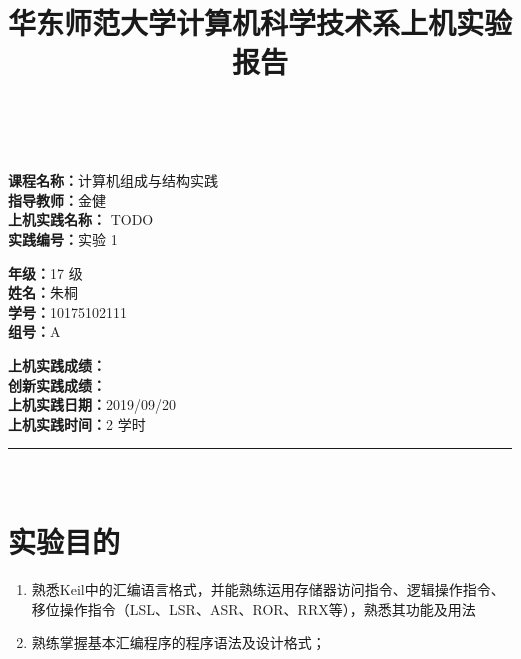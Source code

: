 \documentclass[a4paper,10pt,UTF8]{paper}
\title{华东师范大学计算机科学技术系上机实验报告}
\numberwithin{equation}{section}
\numberwithin{figure}{section}
\begin{document}
\pagestyle{fancy}
\lhead{}
\rhead{}
\makeatletter
\def\headrule{{\if@fancyplain\let\headrulewidth\plainheadrulewidth\fi%
\color{gray}\hrule\@height 0.2pt\@width\headwidth}
  \vspace{6mm}}
\makeatother

\newcommand{\HRule}{\rule{\linewidth}{1mm}}
\newcommand{\dai}{\textbf{Dais-CMX16$^+$}}

{ \\ [0.8cm]

\small{
  \begin{minipage}[t]{.32\linewidth}
    \textbf{课程名称：}计算机组成与结构实践\\
    \textbf{指导教师：}金健\\
    \textbf{上机实践名称：} TODO\\
    \textbf{实践编号：}实验 1
  \end{minipage}
  \begin{minipage}[t]{.32\linewidth}
    \textbf{年级：}17 级\\
    \textbf{姓名：}朱桐\\
    \textbf{学号：}10175102111\\
    \textbf{组号：}A
  \end{minipage} 
  \begin{minipage}[t]{.32\linewidth}
    \textbf{上机实践成绩：} \\
    \textbf{创新实践成绩：} \\
    \textbf{上机实践日期：}2019/09/20\\
    \textbf{上机实践时间：}2 学时\\
  \end{minipage}
}
\HRule \\[0.5cm]
}


\section{实验目的}

\begin{enumerate}
    \item 熟悉Keil中的汇编语言格式，并能熟练运用存储器访问指令、逻辑操作指令、移位操作指令（LSL、LSR、ASR、ROR、RRX等），熟悉其功能及用法
    \item 熟练掌握基本汇编程序的程序语法及设计格式；
\end{enumerate}
\end{document}
